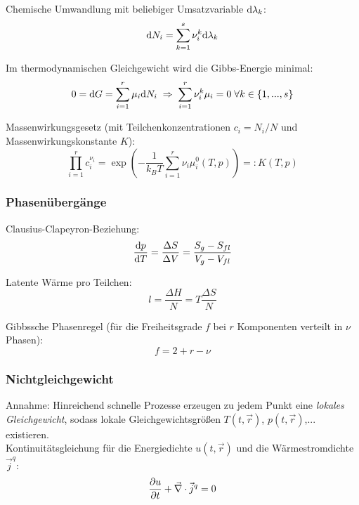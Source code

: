 \documentclass[11pt]{article}
\numberwithin{equation}{section}
\begin{document}
				\noindent
				Chemische Umwandlung mit beliebiger Umsatzvariable $\mathrm{d} \lambda_k$:
				\begin{equation}
					\mathrm{d} N_i = \sum_{k=1}^s \nu_i^k \mathrm{d} \lambda_k
				\end{equation}

				\noindent
				Im thermodynamischen Gleichgewicht wird die Gibbs-Energie minimal:
				\begin{equation}
						0 = \mathrm{d} G = \sum_{i=1}^r \mu_i \mathrm{d} N_i \;\Rightarrow\; \sum_{i=1}^r \nu_i^k \mu_i = 0 \;\forall k\in\lbrace1,...,s\rbrace
				\end{equation}

				\noindent
				Massenwirkungsgesetz (mit Teilchenkonzentrationen $c_i = N_i/N$ und Massenwirkungskonstante $K$):
				\begin{equation}
					\prod_{i=1}^r	c_i^{\nu_i} = \exp\left( -\frac{1}{k_B T}\sum_{i=1}^r \nu_i\mu_i^0(T,p) \right) =: K(T,p)
				\end{equation}

			\subsubsection{Phasenübergänge}
				\noindent
				Clausius-Clapeyron-Beziehung:
				\begin{equation}
					\frac{\mathrm{d} p}{\mathrm{d} T} = \frac{\Delta S}{\Delta V} = \frac{S_g - S_{fl}}{V_g - V_{fl}}
				\end{equation}

				\noindent
				Latente Wärme pro Teilchen:
				\begin{equation}
					l = \frac{\Delta H}{N} = T\frac{\Delta S}{N}
				\end{equation}

				\noindent
				Gibbssche Phasenregel (für die Freiheitsgrade $f$ bei $r$ Komponenten verteilt in $\nu$ Phasen):
				\begin{equation}
					f = 2 + r - \nu
				\end{equation}

			\subsubsection{Nichtgleichgewicht}
				\noindent
				Annahme: Hinreichend schnelle Prozesse erzeugen zu jedem Punkt eine \emph{lokales Gleichgewicht}, sodass lokale Gleichgewichtsgrößen $T(t,\vec{r})$, $p(t,\vec{r})$,... existieren. \\
				Kontinuitätsgleichung für die Energiedichte $u(t,\vec{r})$ und die Wärmestromdichte $\vec{j}^q$:
				\begin{equation}
					\frac{\partial u}{\partial t} + \vec{\nabla}\cdot\vec{j}^q = 0
				\end{equation}
\end{document}
